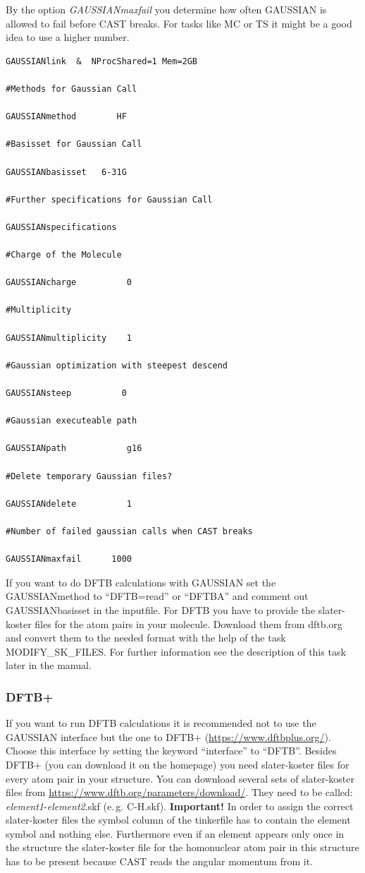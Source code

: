 \documentclass[10pt,a4paper]{article} %
\begin{document}
By the option \textit{GAUSSIANmaxfail} you determine how often GAUSSIAN is allowed to fail before CAST breaks. For tasks like MC or TS it might be a good idea to use a higher number.\\
\begin{lstlisting}
GAUSSIANlink  &  NProcShared=1 Mem=2GB

#Methods for Gaussian Call

GAUSSIANmethod        HF

#Basisset for Gaussian Call

GAUSSIANbasisset   6-31G   

#Further specifications for Gaussian Call

GAUSSIANspecifications 

#Charge of the Molecule

GAUSSIANcharge          0

#Multiplicity 

GAUSSIANmultiplicity    1

#Gaussian optimization with steepest descend 

GAUSSIANsteep          0

#Gaussian executeable path 

GAUSSIANpath            g16

#Delete temporary Gaussian files?

GAUSSIANdelete          1

#Number of failed gaussian calls when CAST breaks

GAUSSIANmaxfail      1000
\end{lstlisting}

If you want to do DFTB calculations with GAUSSIAN set the GAUSSIANmethod to ``DFTB=read'' or ``DFTBA'' and comment out GAUSSIANbasisset in the inputfile. For DFTB you have to provide the slater-koster files for the atom pairs in your molecule. Download them from dftb.org and convert them to the needed format with the help of the task MODIFY\_SK\_FILES. For further information see the description of this task later in the manual.

\subsubsection{DFTB+}

If you want to run DFTB calculations it is recommended not to use the GAUSSIAN interface but the one to DFTB+ (\url{https://www.dftbplus.org/}). Choose this interface by setting the keyword ``interface'' to ``DFTB''. Besides DFTB+ (you can download it on the homepage) you need slater-koster files for every atom pair in your structure. You can download several sets of slater-koster files from \url{https://www.dftb.org/parameters/download/}. They need to be called: \textit{element1}-\textit{element2}.skf (e.\,g. C-H.skf). \textbf{Important!} In order to assign the correct slater-koster files the symbol column of the tinkerfile has to contain the element symbol and nothing else. Furthermore even if an element appears only once in the structure the slater-koster file for the homonuclear atom pair in this structure has to be present because CAST reads the angular momentum from it.
\end{document}
